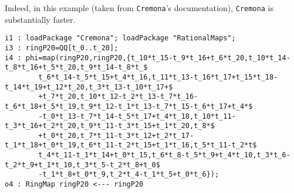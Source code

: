 \documentclass[11pt]{amsart}%
\numberwithin{equation}{theorem}
\renewcommand{\:}{\colon}
\theoremstyle{theorem}
\begin{document}
{{Indeed, in this example (taken from {\tt Cremona}'s documentation), {\tt Cremona} is substantially faster.
{\scriptsize
\color{blue}\begin{verbatim}
i1 : loadPackage "Cremona"; loadPackage "RationalMaps";
i3 : ringP20=QQ[t_0..t_20];    
i4 : phi=map(ringP20,ringP20,{t_10*t_15-t_9*t_16+t_6*t_20,t_10*t_14-t_8*t_16+t_5*t_20,t_9*t_14-t_8*t_$
        t_6*t_14-t_5*t_15+t_4*t_16,t_11*t_13-t_16*t_17+t_15*t_18-t_14*t_19+t_12*t_20,t_3*t_13-t_10*t_17+$
        +t_7*t_20,t_10*t_12-t_2*t_13-t_7*t_16-t_6*t_18+t_5*t_19,t_9*t_12-t_1*t_13-t_7*t_15-t_6*t_17+t_4*$
        -t_0*t_13-t_7*t_14-t_5*t_17+t_4*t_18,t_10*t_11-t_3*t_16+t_2*t_20,t_9*t_11-t_3*t_15+t_1*t_20,t_8*$
        +t_0*t_20,t_7*t_11-t_3*t_12+t_2*t_17-t_1*t_18+t_0*t_19,t_6*t_11-t_2*t_15+t_1*t_16,t_5*t_11-t_2*t$
        t_4*t_11-t_1*t_14+t_0*t_15,t_6*t_8-t_5*t_9+t_4*t_10,t_3*t_6-t_2*t_9+t_1*t_10,t_3*t_5-t_2*t_8+t_0$
        -t_1*t_8+t_0*t_9,t_2*t_4-t_1*t_5+t_0*t_6});    
o4 : RingMap ringP20 <--- ringP20                                                                     


\end{verbatim}}}}
\end{document}
